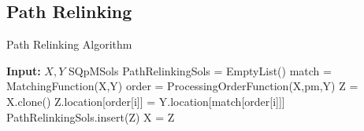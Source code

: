\subsection{Path Relinking}
\begin{frame}{}{}
  \begin{algorithm}[H]
    \caption{Path Relinking Algorithm}
    \label{algPR}
    \begin{algorithmic}
      \State \textbf{Input:} $X,Y$ SQpMSols
      \State PathRelinkingSols = EmptyList()
      \State match = MatchingFunction(X,Y)
      \State order = ProcessingOrderFunction(X,pm,Y)
      \State Z = X.clone()
      \State Z.location[order[i]] = Y.location[match[order[i]]]
      \State PathRelinkingSols.insert(Z)
      \State X = Z
      \EndIf
      \EndFor
    \end{algorithmic}
  \end{algorithm}
\end{frame}

